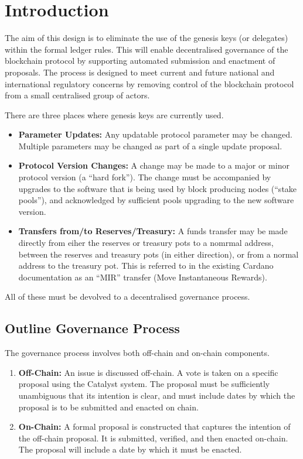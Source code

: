 \section{Introduction}

The aim of this design is to eliminate the use of the genesis keys (or delegates) within the formal ledger rules.  This will enable
decentralised governance of the blockchain protocol by supporting automated submission and enactment of proposals.
The process is designed to meet current and future national and international regulatory concerns by removing control of the blockchain protocol
from a small centralised group of actors.

There are three places where genesis keys are currently used.


\begin{itemize}
\item
  \textbf{Parameter Updates:}
  Any updatable protocol parameter may be changed.  Multiple parameters may be changed as part of a single update proposal.
\item
  \textbf{Protocol Version Changes:}
  A change may be made to a major or minor protocol version (a ``hard fork'').  The change must be accompanied by upgrades to
  the software that is being used by block producing nodes (``stake pools''), and acknowledged by sufficient pools upgrading to the new software version.
\item
  \textbf{Transfers from/to Reserves/Treasury:}
  A funds transfer may be made directly from eiher the reserves or treasury pots to a nomrmal address, between the reserves and treasury pots (in either direction), or from a normal address to the treasury pot.  This is referred to in the existing Cardano documentation as an ``MIR'' transfer (Move Instantaneous Rewards).
\end{itemize}

All of these must be devolved to a decentralised governance process.

\subsection{Outline Governance Process}

The governance process involves both off-chain and on-chain components.

\begin{enumerate}
\item
  \textbf{Off-Chain:}
  An issue is discussed off-chain.  A vote is taken on a specific proposal using the Catalyst system.  The proposal must be sufficiently unambiguous that its intention is clear, and must include dates by which the proposal is to be submitted and enacted on chain.
\item
  \textbf{On-Chain:}
  A formal proposal is constructed that captures the intention of the off-chain proposal.  It is submitted, verified, and then enacted on-chain.  The proposal will include a date by which it must be enacted.
\end{enumerate}


